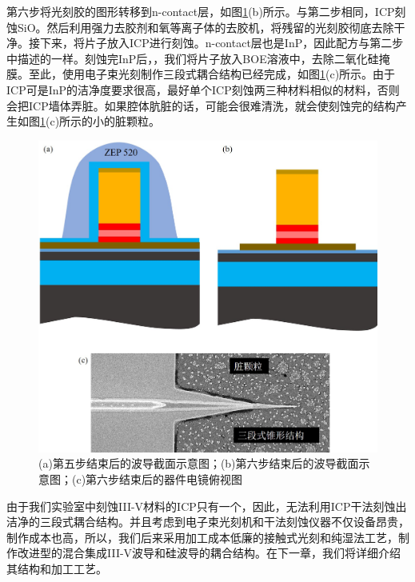 第六步将光刻胶的图形转移到n-contact层，如图\ref{fig_ch3_step5_6}(b)所示。与第二步相同，ICP刻蚀SiO。然后利用强力去胶剂和氧等离子体的去胶机，将残留的光刻胶彻底去除干净。接下来，将片子放入ICP进行刻蚀。n-contact层也是InP，因此配方与第二步中描述的一样。刻蚀完InP后，，我们将片子放入BOE溶液中，去除二氧化硅掩膜。至此，使用电子束光刻制作三段式耦合结构已经完成，如图\ref{fig_ch3_step5_6}(c)所示。由于ICP可是InP的洁净度要求很高，最好单个ICP刻蚀两三种材料相似的材料，否则会把ICP墙体弄脏。如果腔体肮脏的话，可能会很难清洗，就会使刻蚀完的结构产生如图\ref{fig_ch3_step5_6}(c)所示的小的脏颗粒。
\begin{figure}[htb]
	\centering
	\includegraphics[width=14cm]{./Pictures/fig_ch3_step5_6.jpg}
	\caption{(a)第五步结束后的波导截面示意图；(b)第六步结束后的波导截面示意图；(c)第六步结束后的器件电镜俯视图}
	\label{fig_ch3_step5_6}
\end{figure}

由于我们实验室中刻蚀III-V材料的ICP只有一个，因此，无法利用ICP干法刻蚀出洁净的三段式耦合结构。并且考虑到电子束光刻机和干法刻蚀仪器不仅设备昂贵，制作成本也高，所以，我们后来采用加工成本低廉的接触式光刻和纯湿法工艺，制作改进型的混合集成III-V波导和硅波导的耦合结构。在下一章，我们将详细介绍其结构和加工工艺。
